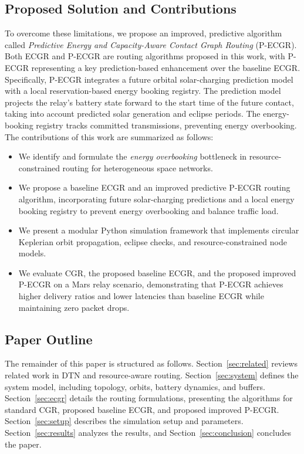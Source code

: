 \documentclass[a4paper,fleqn]{cas-dc}
\newcommand{\ecgr}{\textsf{ECGR}}
\newcommand{\pecgr}{\textsf{P-ECGR}}
\begin{document}
\subsection{Proposed Solution and Contributions}
To overcome these limitations, we propose an improved, predictive algorithm called \emph{Predictive Energy and Capacity-Aware Contact Graph Routing} (\pecgr{}). Both \ecgr{} and \pecgr{} are routing algorithms proposed in this work, with \pecgr{} representing a key prediction-based enhancement over the baseline \ecgr{}. Specifically, \pecgr{} integrates a future orbital solar-charging prediction model with a local reservation-based energy booking registry. The prediction model projects the relay's battery state forward to the start time of the future contact, taking into account predicted solar generation and eclipse periods. The energy-booking registry tracks committed transmissions, preventing energy overbooking. The contributions of this work are summarized as follows:
\begin{itemize}
    \item We identify and formulate the \emph{energy overbooking} bottleneck in resource-constrained routing for heterogeneous space networks.
    \item We propose a baseline \ecgr{} and an improved predictive \pecgr{} routing algorithm, incorporating future solar-charging predictions and a local energy booking registry to prevent energy overbooking and balance traffic load.
    \item We present a modular Python simulation framework that implements circular Keplerian orbit propagation, eclipse checks, and resource-constrained node models.
    \item We evaluate CGR, the proposed baseline \ecgr{}, and the proposed improved \pecgr{} on a Mars relay scenario, demonstrating that \pecgr{} achieves higher delivery ratios and lower latencies than baseline \ecgr{} while maintaining zero packet drops.
\end{itemize}

\subsection{Paper Outline}
The remainder of this paper is structured as follows. Section~\ref{sec:related} reviews related work in DTN and resource-aware routing. Section~\ref{sec:system} defines the system model, including topology, orbits, battery dynamics, and buffers. Section~\ref{sec:ecgr} details the routing formulations, presenting the algorithms for standard CGR, proposed baseline \ecgr{}, and proposed improved \pecgr{}. Section~\ref{sec:setup} describes the simulation setup and parameters. Section~\ref{sec:results} analyzes the results, and Section~\ref{sec:conclusion} concludes the paper.
\end{document}
